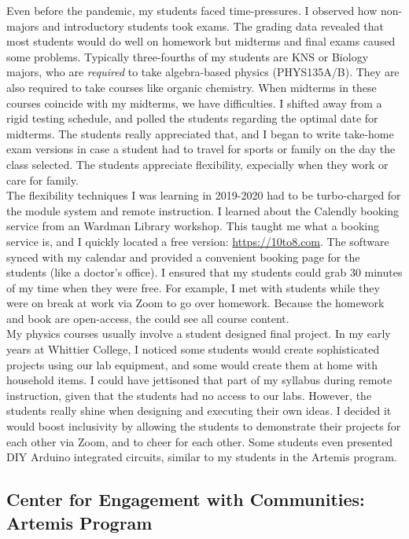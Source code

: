 \documentclass[../../../main.tex]{subfiles}
\begin{document}
Even before the pandemic, my students faced time-pressures.  I observed how non-majors and introductory students took exams.  The grading data revealed that most students would do well on homework but midterms and final exams caused some problems.  Typically three-fourths of my students are KNS or Biology majors, who are \textit{required} to take algebra-based physics (PHYS135A/B).  They are also required to take courses like organic chemistry.  When midterms in these courses coincide with my midterms, we have difficulties.  I shifted away from a rigid testing schedule, and polled the students regarding the optimal date for midterms.  The students really appreciated that, and I began to write take-home exam versions in case a student had to travel for sports or family on the day the class selected.  The students appreciate flexibility, expecially when they work or care for family.
\\
\vspace{0.25cm}
The flexibility techniques I was learning in 2019-2020 had to be turbo-charged for the module system and remote instruction.  I learned about the Calendly booking service from an Wardman Library workshop.  This taught me what a booking service is, and I quickly located a free version: \url{https://10to8.com}.  The software synced with my calendar and provided a convenient booking page for the students (like a doctor's office).  I ensured that my students could grab 30 minutes of my time when they were free.  For example, I met with students while they were on break at work via Zoom to go over homework.  Because the homework and book are open-access, the could see all course content.
\\
\vspace{0.25cm}
My physics courses usually involve a student designed final project.  In my early years at Whittier College, I noticed some students would create sophisticated projects using our lab equipment, and some would create them at home with household items.  I could have jettisoned that part of my syllabus during remote instruction, given that the students had no access to our labs.  However, the students really shine when designing and executing their own ideas.  I decided it would boost inclusivity by allowing the students to demonstrate their projects for each other via Zoom, and to cheer for each other.  Some students even presented DIY Arduino integrated circuits, similar to my students in the Artemis program.

\subsection{Center for Engagement with Communities: Artemis Program}
\label{sec:cec}
\end{document}
